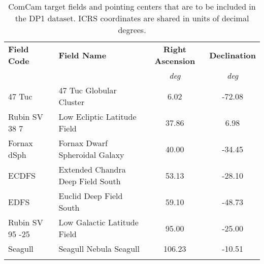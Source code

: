\begin{table*}
    \centering
      \caption{ComCam target fields and pointing centers that are to be included in the DP1 dataset. ICRS coordinates are shared in units of decimal degrees.}
    \begin{tabular}{@{}llcc@{}}
           \noalign{\vspace{5pt}}\hline\hline \noalign{\vspace{5pt}}
      \textbf{Field Code} & \textbf{ Field Name}  &\textbf{Right Ascension} & \textbf{Declination} \\ \noalign{\vspace{1pt}}
       \cline{3-4}  \noalign{\vspace{1pt}}
    & & \textit{deg} & \textit{deg} \\ \noalign{\vspace{1pt}}
    \hline  \noalign{\vspace{3pt}}
    47 Tuc & 47 Tuc Globular Cluster              & 6.02    & -72.08    \\
    Rubin SV 38 7 & Low Ecliptic Latitude Field  & 37.86   & 6.98      \\
    Fornax dSph &Fornax Dwarf Spheroidal Galaxy  & 40.00   & -34.45    \\
    ECDFS & Extended Chandra Deep Field South     & 53.13   & -28.10    \\
    EDFS & Euclid Deep Field South                 & 59.10   & -48.73    \\
    Rubin SV 95 -25 & Low Galactic Latitude Field  & 95.00   & -25.00    \\
    Seagull & Seagull Nebula Seagull                     & 106.23  & -10.51    \\
     \noalign{\vspace{3pt}}\hline
    \end{tabular}
    \label{tab:dp1_fields}
\end{table*}
